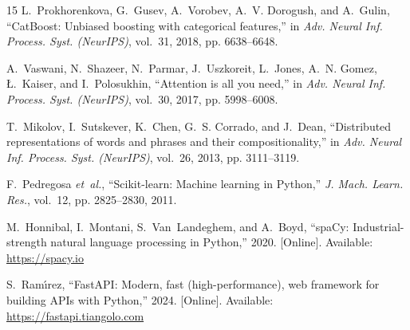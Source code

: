 \documentclass[conference]{IEEEtran}
\begin{document}
\begin{thebibliography}{15}
L.~Prokhorenkova, G.~Gusev, A.~Vorobev, A.~V. Dorogush, and A.~Gulin, ``CatBoost: Unbiased boosting with categorical features,'' in \emph{Adv. Neural Inf. Process. Syst. (NeurIPS)}, vol.~31, 2018, pp. 6638--6648.

A.~Vaswani, N.~Shazeer, N.~Parmar, J.~Uszkoreit, L.~Jones, A.~N. Gomez, {\L}.~Kaiser, and I.~Polosukhin, ``Attention is all you need,'' in \emph{Adv. Neural Inf. Process. Syst. (NeurIPS)}, vol.~30, 2017, pp. 5998--6008.

T.~Mikolov, I.~Sutskever, K.~Chen, G.~S. Corrado, and J.~Dean, ``Distributed representations of words and phrases and their compositionality,'' in \emph{Adv. Neural Inf. Process. Syst. (NeurIPS)}, vol.~26, 2013, pp. 3111--3119.

F.~Pedregosa \emph{et~al.}, ``Scikit-learn: Machine learning in Python,'' \emph{J. Mach. Learn. Res.}, vol.~12, pp. 2825--2830, 2011.

M.~Honnibal, I.~Montani, S.~Van~Landeghem, and A.~Boyd, ``spaCy: Industrial-strength natural language processing in Python,'' 2020. [Online]. Available: \url{https://spacy.io}

S.~Ram{\'\i}rez, ``FastAPI: Modern, fast (high-performance), web framework for building APIs with Python,'' 2024. [Online]. Available: \url{https://fastapi.tiangolo.com}

\end{thebibliography}
\end{document}
